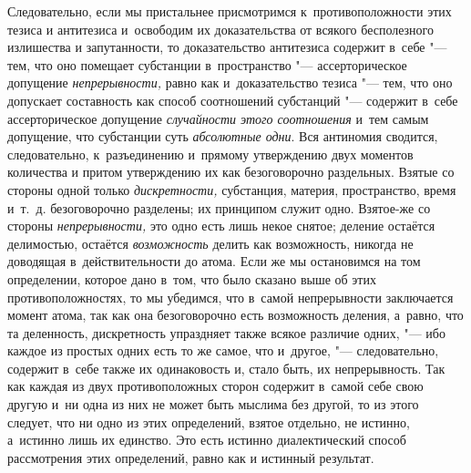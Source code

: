 Следовательно, если мы пристальнее присмотримся к~противоположности этих тезиса
и антитезиса и~освободим их доказательства от всякого бесполезного излишества и
запутанности, то доказательство антитезиса содержит в~себе "--- тем, что оно
помещает субстанции в~пространство "--- ассерторическое допущение
{\em непрерывности,} равно как и~доказательство тезиса "--- тем, что оно
допускает составность как способ соотношений субстанций "--- содержит в~себе
ассерторическое допущение {\em случайности этого соотношения} и~тем самым
допущение, что субстанции суть {\em абсолютные одни}. Вся антиномия сводится,
следовательно, к~разъединению и~прямому утверждению двух моментов количества и
притом утверждению их как безоговорочно раздельных. Взятые со стороны одной
только {\em дискретности,} субстанция, материя, пространство, время и~т.~д.
безоговорочно разделены; их принципом служит одно. Взятое-же со стороны
{\em непрерывности,} это одно есть лишь некое снятое; деление остаётся
делимостью, остаётся {\em возможность} делить как возможность, никогда не
доводящая в~действительности до атома. Если же мы остановимся на том
определении, которое дано в~том, что было сказано выше об этих
противоположностях, то мы убедимся, что в~самой непрерывности заключается
момент атома, так как она безоговорочно есть возможность деления, а~равно, что
та деленность, дискретность упраздняет также всякое различие одних, "--- ибо
каждое из простых одних есть то же самое, что и~другое, "--- следовательно,
содержит в~себе также их одинаковость и, стало быть, их непрерывность. Так как
каждая из двух противоположных сторон содержит в~самой себе свою другую и~ни
одна из них не может быть мыслима без другой, то из этого следует, что ни одно
из этих определений, взятое отдельно, не истинно, а~истинно лишь их единство.
Это есть истинно диалектический способ рассмотрения этих определений, равно как
и истинный результат.

